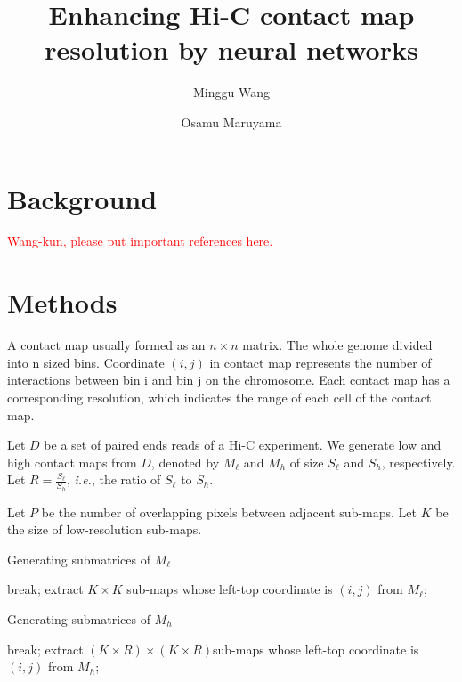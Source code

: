 \documentclass[a4paper,12pt]{article}
\begin{document}
\title{Enhancing Hi-C contact map resolution by neural networks}
\author{Minggu Wang \and Osamu Maruyama}
\maketitle

\section{Background}

\textcolor{red}{Wang-kun, please put important references here.}


\section{Methods}

A contact map usually formed as  an $n \times n$ matrix. The whole genome divided into n sized bins. Coordinate $(i,j)$ in contact map represents the number of interactions between bin i and bin j on the chromosome. Each contact map has a corresponding resolution, which indicates the range of each cell of the contact map.


Let $D$ be a set of paired ends reads of a Hi-C experiment. 
We generate low and high contact maps from $D$, 
denoted by $M_\ell$ and $M_h$ of size $S_\ell$ and $S_h$, respectively.  
Let $R = \frac{S_\ell}{S_h}$, \textit{i.e.}, 
the ratio of $S_\ell$ to $S_h$.  

Let $P$ be the number of overlapping pixels between adjacent sub-maps.
Let $K$ be the size of low-resolution sub-maps.

\begin{algorithm}[htbp]
\caption{Generating submatrices of $M_\ell$}
\begin{algorithmic}
                \STATE break;
            \ELSE 
                \STATE extract $K \times K$ sub-maps whose left-top coordinate is $(i,j)$ from $M_\ell$;
            \ENDIF    
        \ENDFOR
    \ENDFOR
\end{algorithmic}
\end{algorithm}

\begin{algorithm}[htbp]
\caption{Generating submatrices of $M_h$}
\begin{algorithmic}
                \STATE break; 
            \ELSE 
                \STATE extract $(K \times R) \times (K \times R)$sub-maps whose left-top coordinate is $(i,j)$ from $M_h$;
            \ENDIF
        \ENDFOR
    \ENDFOR    
\end{algorithmic}
\end{algorithm}
\end{document}
